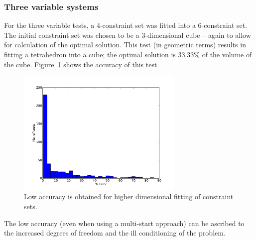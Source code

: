 \subsubsection{Three variable systems}
For the three variable tests, a 4-constraint set was fitted into a 6-constraint set.
The initial constraint set was chosen to be a 3-dimensional cube -- again to allow for calculation of the optimal solution.
This test (in geometric terms) results in fitting a tetrahedron into a cube; the optimal solution is 33.33\% of the volume of the cube.
Figure~\ref{fig:arbfitaccuracy3d} shows the accuracy of this test.

\begin{figure}[htbp]
  \centering
    \includegraphics[width=8cm]{graph/arbfitaccuracy2d.pdf}  
  \caption[Accuracy of constraint set fitting for 3 variables]{Low accuracy is obtained for higher dimensional fitting of constraint sets.}
  \label{fig:arbfitaccuracy3d}
\end{figure}

The low accuracy (even when using a multi-start approach) can be ascribed to the increased degrees of freedom and the ill conditioning of the problem.

